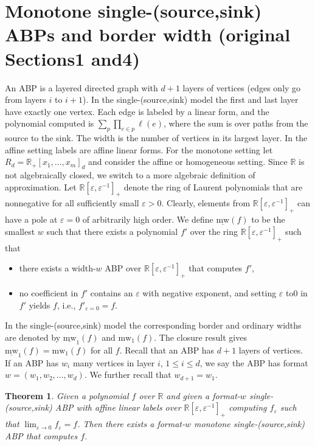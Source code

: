 \documentclass[10pt,a4paper]{article}
\newtheorem{theorem}{Theorem}
\newcommand{\R}{\mathbb R}
\newcommand{\mw}{\mathrm{mw}}
\begin{document}
\section*{Monotone single-(source,sink) ABPs and border width (original Sections1 and4)}
An ABP is a layered directed graph with $d+1$ layers of vertices (edges only go from layers $i$ to $i+1$). In the single-(source,sink) model the first and last layer have exactly one vertex. Each edge is labeled by a linear form, and the polynomial computed is $\sum_p\prod_{e\in p}\ell(e)$, where the sum is over paths from the source to the sink. The width is the number of vertices in its largest layer. In the affine setting labels are affine linear forms.
For the monotone setting let $R_d=\R_+[x_1,\ldots,x_m]_d$ and consider the affine or homogeneous setting. Since $\R$ is not algebraically closed, we switch to a more algebraic definition of approximation. Let $\R[\varepsilon,\varepsilon^{-1}]_+$ denote the ring of Laurent polynomials that are nonnegative for all sufficiently small $\varepsilon>0$. Clearly, elements from $\R[\varepsilon,\varepsilon^{-1}]_+$ can have a pole at $\varepsilon=0$ of arbitrarily high order. We define $\underline{\mw}(f)$ to be the smallest $w$ such that there exists a polynomial $f'$ over the ring $\R[\varepsilon,\varepsilon^{-1}]_+$ such that
\begin{itemize}
\item there exists a width-$w$ ABP over $\R[\varepsilon,\varepsilon^{-1}]_+$ that computes $f'$,
\item no coefficient in $f'$ contains an $\varepsilon$ with negative exponent, and setting $\varepsilon$ to0 in $f'$ yields $f$, i.e., $f'_{\varepsilon=0}=f$.
\end{itemize}
In the single-(source,sink) model the corresponding border and ordinary widths are denoted by $\underline{\mw}_1(f)$ and $\mw_1(f)$. The closure result gives $\underline{\mw}_1(f)=\mw_1(f)$ for all $f$.
Recall that an ABP has $d+1$ layers of vertices. If an ABP has $w_i$ many vertices in layer $i$, $1\le i\le d$, we say the ABP has format $w=(w_1,w_2,\ldots,w_d)$. We further recall that $w_{d+1}=w_1$.
\setcounter{theorem}{2}

\begin{theorem}\label{thm:monotone-closure}
Given a polynomial $f$ over $\R$ and given a format-$w$ single-(source,sink) ABP with affine linear labels over $\R[\varepsilon,\varepsilon^{-1}]_+$ computing $f_\varepsilon$ such that $\lim_{\varepsilon\to0}f_\varepsilon=f$. Then there exists a format-$w$ monotone single-(source,sink) ABP that computes $f$.
\end{theorem}
\end{document}
